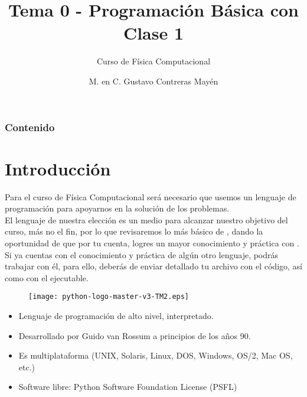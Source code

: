 


\title{Tema 0 - Programación Básica con \python \\ Clase 1}
\subtitle{Curso de Física Computacional}
\author[]{M. en C. Gustavo Contreras Mayén}
\date{ }
\maketitle
\fontsize{14}{14}\selectfont
{}
\begin{frame}
\frametitle{Contenido}
\tableofcontents[pausesections]
\end{frame}
\section{Introducción}
\begin{frame}
Para el curso de Física Computacional será necesario que usemos un lenguaje de programación para apoyarnos en la solución de los problemas.
\\
\bigskip
El lenguaje de nuestra elección es un medio para alcanzar nuestro objetivo del curso, más no el fin, por lo que revisaremos lo más básico de \python, dando la oportunidad de que por tu cuenta, logres un mayor conocimiento y práctica con \python.
\\
\bigskip
Si ya cuentas con el conocimiento y práctica de algún otro lenguaje, podrás trabajar con él, para ello, deberás de enviar detallado tu archivo con el código, así como con el ejecutable.
\end{frame}
\begin{frame}
\begin{figure}
	\centering
	\texttt{[image: python-logo-master-v3-TM2.eps]} 
\end{figure}
\begin{uncoverenv}
\begin{itemize}[<+->]
\item Lenguaje de programación de alto nivel, interpretado.
\item Desarrollado por Guido van Rossum a principios de
los años 90.
\item Es multiplataforma (UNIX, Solaris, Linux, DOS, Windows, OS/2, Mac OS, etc.)
\item Software libre: Python Software Foundation License (PSFL)
\end{itemize}
\end{uncoverenv}
\end{frame}
